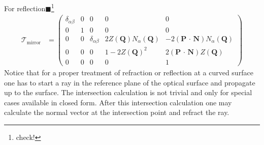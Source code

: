 \documentclass[12pt,a4paper,twoside,openright,BCOR10mm,headsepline,titlepage,abstracton,chapterprefix,final]{scrreprt}
\newcommand\Vector[1]{{\mathbf{#1}}}
\newcommand{\scpm}[2]{(#1\,\cdot\,#2)}
\newcommand{\remark}[1]{{\color{red}$\blacksquare$}\footnote{{\color{red}#1}}}
\begin{document}
For reflection\remark{check!}
\begin{align}
 \mathcal{T}_{\text{mirror}} &=
 \begin{pmatrix}
  \delta_{\alpha\beta} & 0 &  0 & 0 & 0\\
   0                   & 1 & 0 & 0 & 0\\
   0                   & 0 & \delta_{\alpha\beta} & 2 Z(\Vector{Q}) N_\alpha(\Vector{Q}) & -2 \scpm{\Vector{P}}{\Vector{N}} N_\alpha(\Vector{Q}) \\
   0                   & 0 & 0 & 1 - 2 Z(\Vector{Q})^2 & 2 \scpm{\Vector{P}}{\Vector{N}} Z(\Vector{Q}) \\
   0 & 0 & 0 & 0 & 1
 \end{pmatrix}
\end{align}
Notice that for a proper treatment of refraction or reflection at a curved surface one has to start a ray in the reference plane of the 
optical surface and propagate up to the surface. The intersection calculation is not trivial and only for special cases
available in closed form. After this intersection calculation one may calculate the normal vector at the intersection point
and refract the ray.
\end{document}
